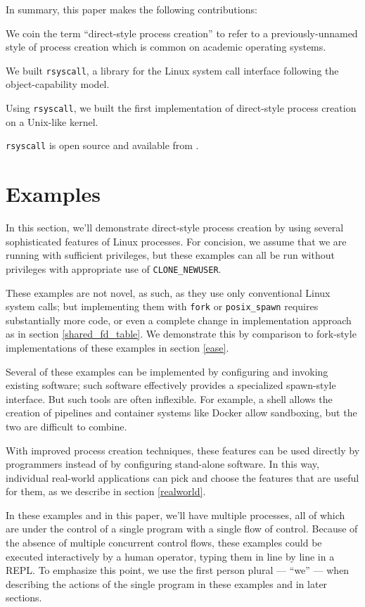 \documentclass[letterpaper,twocolumn,10pt]{article}
\begin{document}
In summary, this paper makes the following contributions:
\begin{compactitem}
\item We coin the term ``direct-style process creation''
  to refer to a previously-unnamed style of process creation which is common on academic operating systems.
\item We built \texttt{rsyscall}, a library for the Linux system call interface following the object-capability model.
\item Using \texttt{rsyscall}, we built the first implementation of direct-style process creation on a Unix-like kernel.
\end{compactitem}
\texttt{rsyscall} is open source and available from \githuburl{}.
\section{Examples}\label{examples}
In this section,
we'll demonstrate direct-style process creation
by using several sophisticated features of Linux processes.
For concision, we assume that we are running with sufficient privileges,
but these examples can all be run without privileges with appropriate use of \verb|CLONE_NEWUSER|.
\cite{user_namespaces}\cite{unpriv_fuse}

These examples are not novel, as such, as they use only conventional Linux system calls;
but implementing them with \texttt{fork} or \verb|posix_spawn| requires substantially more code,
or even a complete change in implementation approach as in section \ref{shared_fd_table}.
We demonstrate this by comparison to fork-style implementations of these examples in section \ref{ease}.

Several of these examples can be implemented by configuring and invoking existing software;
such software effectively provides a specialized spawn-style interface.
But such tools are often inflexible.
For example, a shell allows the creation of pipelines and container systems like Docker allow sandboxing,
but the two are difficult to combine.\cite{docker_pipe}

With improved process creation techniques,
these features can be used directly by programmers
instead of by configuring stand-alone software.
In this way,
individual real-world applications can pick and choose the features that are useful for them,
as we describe in section \ref{realworld}.

In these examples and in this paper,
we'll have multiple processes,
all of which are under the control of a single program with a single flow of control.
Because of the absence of multiple concurrent control flows,
these examples could be executed interactively by a human operator,
typing them in line by line in a REPL.
To emphasize this point, we use the first person plural --- ``we'' ---
when describing the actions of the single program in these examples and in later sections.
\end{document}
